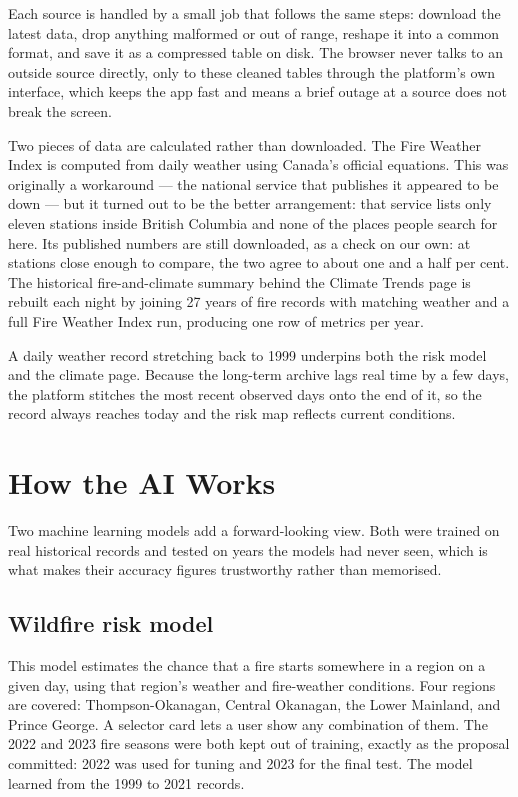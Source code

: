 \documentclass[11pt]{article}
\begin{document}
Each source is handled by a small job that follows the same steps: download the
latest data, drop anything malformed or out of range, reshape it into a common
format, and save it as a compressed table on disk. The browser never talks to an
outside source directly, only to these cleaned tables through the platform's own
interface, which keeps the app fast and means a brief outage at a source does
not break the screen.

Two pieces of data are calculated rather than downloaded. The Fire Weather Index
is computed from daily weather using Canada's official equations. This was
originally a workaround --- the national service that publishes it appeared to be
down --- but it turned out to be the better arrangement: that service lists only
eleven stations inside British Columbia and none of the places people search for
here. Its published numbers are still downloaded, as a check on our own: at
stations close enough to compare, the two agree to about one and a half per
cent. The historical fire-and-climate summary behind the Climate Trends page is
rebuilt each night by joining 27 years of fire records with matching weather and
a full Fire Weather Index run, producing one row of metrics per year.

A daily weather record stretching back to 1999 underpins both the risk model and
the climate page. Because the long-term archive lags real time by a few days,
the platform stitches the most recent observed days onto the end of it, so the
record always reaches today and the risk map reflects current conditions.

\section{How the AI Works}

Two machine learning models add a forward-looking view. Both were trained on
real historical records and tested on years the models had never seen, which is
what makes their accuracy figures trustworthy rather than memorised.

\subsection{Wildfire risk model}

This model estimates the chance that a fire starts somewhere in a region on a
given day, using that region's weather and fire-weather conditions. Four regions
are covered: Thompson-Okanagan, Central Okanagan, the Lower Mainland, and Prince
George. A selector card lets a user show any combination of them. The 2022 and
2023 fire seasons were both kept out of training, exactly as the proposal
committed: 2022 was used for tuning and 2023 for the final test. The model
learned from the 1999 to 2021 records.
\end{document}
